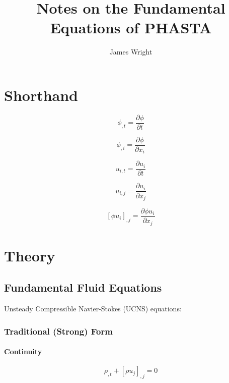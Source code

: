 \documentclass[11pt, letterpaper, twoside]{article}
\title{Notes on the Fundamental Equations of PHASTA}
\author{James Wright}
\begin{document}
\maketitle

\section{Shorthand}
    \begin{equation*}
        \phi_{,t} = \frac{\partial \phi}{\partial t}
    \end{equation*}

    \begin{equation*}
        \phi_{,i} = \frac{\partial \phi}{\partial x_i}
    \end{equation*}

    \begin{equation*}
        u_{i,t} = \frac{\partial u_i}{\partial t}
    \end{equation*}

    \begin{equation*}
        u_{i,j} = \frac{\partial u_i}{\partial x_j}
    \end{equation*}

    \begin{equation*}
        \left[\phi u_i \right]_{,j} = \frac{\partial \phi u_i}{\partial x_j}
    \end{equation*}

\section{Theory}
\subsection{Fundamental Fluid Equations}
Unsteady Compressible Navier-Stokes (UCNS) equations:

    \subsubsection{Traditional (Strong) Form}
    \paragraph{Continuity}
        \begin{equation}\label{eq:fund_continuity}
            \rho_{,t} + \left[\rho u_j \right]_{,j} = 0
        \end{equation}
\end{document}

